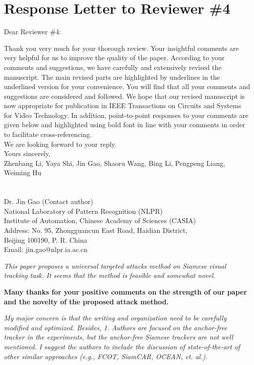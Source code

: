 \documentclass[12pt]{article}
\begin{document}
\clearpage
\newpage
{\centering\section*{Response Letter to Reviewer \#4}}
\noindent Dear Reviewer \#4:

Thank you very much for your thorough review. Your insightful comments are very helpful for us to improve the quality of the paper. According to your comments and suggestions, we have carefully and extensively revised the manuscript. The main revised parts are highlighted by underlines in the underlined version for your convenience. You will find that all your comments and suggestions are considered and followed. We hope that our revised manuscript is now appropriate for publication in IEEE Transactions on Circuits and Systems for Video Technology.
In addition, point-to-point responses to your comments are given below and highlighted using bold font in line with your comments in order to facilitate cross-referencing.\\[10pt]
\indent We are looking forward to your reply.\\[10pt]
\noindent Yours sincerely,\\
\noindent Zhenbang Li, Yaya Shi, Jin Gao, Shaoru Wang, Bing Li, Pengpeng Liang, Weiming Hu
\\
\\
\\
\noindent Dr. Jin Gao (Contact author)\\
\noindent National Laboratory of Pattern Recognition (NLPR)\\
\noindent Institute of Automation, Chinese Academy of Sciences (CASIA)\\
\noindent Address: No. 95, Zhongguancun East Road, Haidian District,\\
\noindent Beijing 100190, P. R. China\\
\noindent Email: jin.gao@nlpr.ia.ac.cn

\newpage
\textit{This paper proposes a universal targeted attacks method on Siamese visual tracking task. It seems that the method is feasible and somewhat novel.}

\textbf{Many thanks for your positive comments on the strength of our paper and the novelty of the proposed attack method.}

\textit{My major concern is that the writing and organization need to be carefully modified and optimized. Besides, 1. Authors are focused on the anchor-free tracker in the experiments, but the anchor-free Siamese trackers are not well mentioned. I suggest the authors to include the discussion of state-of-the-art of other similar approaches (e.g., FCOT, SiamCAR, OCEAN, et. al.).}
\end{document}
